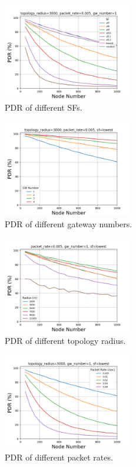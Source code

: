 \documentclass[conference]{IEEEtran}
\begin{document}
\begin{figure}
\centering
\includegraphics[width=0.5\textwidth]{sf_pdr}
\caption{PDR of different SFs.}
\label{fig:sf_pdr}
\end{figure}

\begin{figure}
\centering
\includegraphics[width=0.5\textwidth]{gw_pdr}
\caption{PDR of different gateway numbers.}
\label{fig:gw_pdr}
\end{figure}

\begin{figure}
\centering
\includegraphics[width=0.5\textwidth]{r_pdr}
\caption{PDR of different topology radius.}
\label{fig:r_pdr}
\end{figure}

\begin{figure}
\centering
\includegraphics[width=0.5\textwidth]{pr_pdr}
\caption{PDR of different packet rates.}
\label{fig:pr_pdr}
\end{figure}
\end{document}
